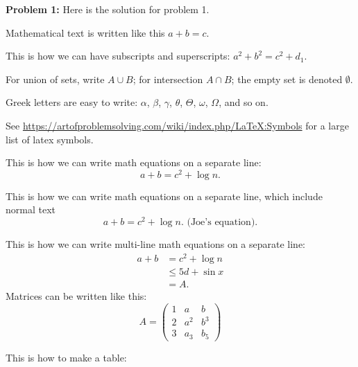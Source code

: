 \documentclass[10pt,letterpaper,final]{report}
\begin{document}
\begin{center}
\vline
\end{center}

\noindent\textbf{Problem 1:}  Here is the solution for problem 1.

Mathematical text is written like this $a+b = c$.

This is how we can have subscripts and superscripts: $a^2 + b^2 = c^2 + d_1$.

For union of sets, write $A \cup B$; for intersection $A \cap B$; the empty set is denoted $\emptyset$.

Greek letters are easy to write: $\alpha$, $\beta$, $\gamma$, $\theta$, $\Theta$, $\omega$, $\Omega$, and so on.

See \url{https://artofproblemsolving.com/wiki/index.php/LaTeX:Symbols} for a large list of latex symbols.

This is how we can write math equations on a separate line:
\[
  a+b = c^2 + \log n.
\]

This is how we can write math equations on a separate line, which include normal text
\[
  a+b = c^2 + \log n. \mbox{    (Joe's equation).}
\]

This is how we can write multi-line math equations on a separate line:
\[
  \begin{array}{ll}
    a+b & = c^2 + \log n   \\
        & \leq 5d + \sin x \\
        & = A.
  \end{array}
\]
Matrices can be written like this:
\[
  A =
  \begin{pmatrix}
    1 & a   & b   \\
    2 & a^2 & b^3 \\
    3 & a_3 & b_5
  \end{pmatrix}
\]
\bigskip

This is how to make a table:

\medskip
\end{document}

